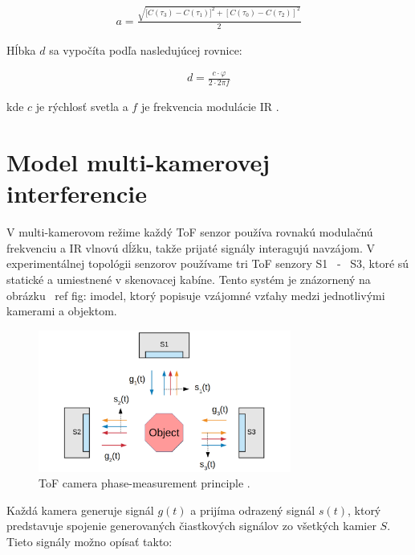 \begin{flushleft}
\begin{equation}
\label{eq::tof::08}
\begin{aligned}
 a =  \frac{\sqrt{{[C(\tau _3) - C(\tau _1)}]^2 + [{C(\tau _0) - C(\tau _2)}]^2}}{2}  
\end{aligned}
\end{equation}


Hĺbka $d$ sa vypočíta podľa nasledujúcej rovnice:


\begin{equation}
\label{eq::tof::09}
\begin{aligned}
 d = \frac{ c \cdot \varphi }{ 2 \cdot 2 \pi f}
\end{aligned}
\end{equation}

kde $c$ je rýchlosť svetla a $f$ je frekvencia modulácie IR \cite {Lange}.
\end{flushleft}

\section{Model multi-kamerovej interferencie}

V multi-kamerovom režime každý ToF senzor používa rovnakú modulačnú frekvenciu a IR vlnovú dĺžku, takže prijaté signály interagujú navzájom. V experimentálnej topológii senzorov používame tri ToF senzory S1 \, - \, S3, ktoré sú statické a umiestnené v skenovacej kabíne. Tento systém je znázornený na obrázku \ ref {fig: imodel}, ktorý popisuje vzájomné vzťahy medzi jednotlivými kamerami a objektom.

\begin{figure}[H]
	\centering
	\includegraphics[width=0.74\textwidth]{figures/interference_model.png}
	\caption{ToF camera phase-measurement principle \cite{Lianhua}.}
	\label{fig:imodel}
\end{figure}  

Každá kamera generuje signál $g(t)$ a prijíma odrazený signál $s(t)$, ktorý predstavuje spojenie generovaných čiastkových signálov zo všetkých kamier $S$. Tieto signály možno opísať takto:

